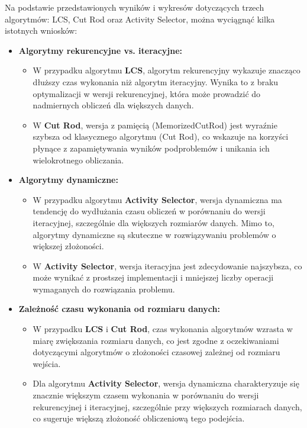 \documentclass[a4paper,12pt]{article}
\begin{document}
Na podstawie przedstawionych wyników i wykresów dotyczących trzech algorytmów: LCS, Cut Rod oraz Activity Selector, można wyciągnąć kilka istotnych wniosków:

\begin{itemize}
    \item \textbf{Algorytmy rekurencyjne vs. iteracyjne:}
    \begin{itemize}
        \item W przypadku algorytmu \textbf{LCS}, algorytm rekurencyjny wykazuje znacząco dłuższy czas wykonania niż algorytm iteracyjny. Wynika to z braku optymalizacji w wersji rekurencyjnej, która może prowadzić do nadmiernych obliczeń dla większych danych.
        \item W \textbf{Cut Rod}, wersja z pamięcią (MemorizedCutRod) jest wyraźnie szybsza od klasycznego algorytmu (Cut Rod), co wskazuje na korzyści płynące z zapamiętywania wyników podproblemów i unikania ich wielokrotnego obliczania.
    \end{itemize}
    \item \textbf{Algorytmy dynamiczne:}
    \begin{itemize}
        \item W przypadku algorytmu \textbf{Activity Selector}, wersja dynamiczna ma tendencję do wydłużania czasu obliczeń w porównaniu do wersji iteracyjnej, szczególnie dla większych rozmiarów danych. Mimo to, algorytmy dynamiczne są skuteczne w rozwiązywaniu problemów o większej złożoności.
        \item W \textbf{Activity Selector}, wersja iteracyjna jest zdecydowanie najszybsza, co może wynikać z prostszej implementacji i mniejszej liczby operacji wymaganych do rozwiązania problemu.
    \end{itemize}
    \item \textbf{Zależność czasu wykonania od rozmiaru danych:}
    \begin{itemize}
        \item W przypadku \textbf{LCS} i \textbf{Cut Rod}, czas wykonania algorytmów wzrasta w miarę zwiększania rozmiaru danych, co jest zgodne z oczekiwaniami dotyczącymi algorytmów o złożoności czasowej zależnej od rozmiaru wejścia.
        \item Dla algorytmu \textbf{Activity Selector}, wersja dynamiczna charakteryzuje się znacznie większym czasem wykonania w porównaniu do wersji rekurencyjnej i iteracyjnej, szczególnie przy większych rozmiarach danych, co sugeruje większą złożoność obliczeniową tego podejścia.
    \end{itemize}
\end{itemize}
\end{document}
